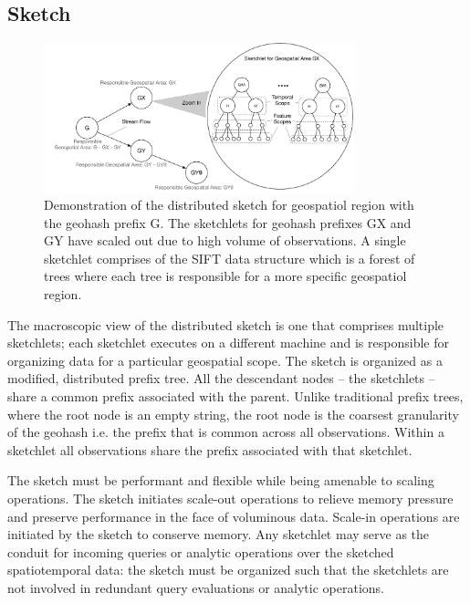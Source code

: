 \subsection{Sketch}
\begin{figure}
    \centerline{\includegraphics[width=0.8\textwidth]{figures/dist-sketch.pdf}}
    \caption{Demonstration of the distributed sketch for geospatiol region with the geohash prefix G. The sketchlets for geohash prefixes GX and GY have scaled out due to high volume of observations. A single sketchlet comprises of the SIFT data structure which is a forest of trees where each tree is responsible for a more specific geospatiol region.}
    \label{fig:dist-sketch}
\end{figure}

The macroscopic view of the distributed sketch is one that comprises multiple sketchlets; each sketchlet executes on a different machine and is responsible for organizing data for a particular geospatial scope. The sketch is organized as a modified, distributed prefix tree. All the descendant nodes – the sketchlets – share a common prefix associated with the parent. Unlike traditional prefix trees, where the root node is an empty string, the root node is the coarsest granularity of the geohash i.e. the prefix that is common across all observations. Within a sketchlet all observations share the prefix associated with that sketchlet.

The sketch must be performant and flexible while being amenable to scaling operations. The sketch initiates scale-out operations to relieve memory pressure and preserve performance in the face of voluminous data. Scale-in operations are initiated by the sketch to conserve memory. Any sketchlet may serve as the conduit for incoming queries or analytic operations over the sketched spatiotemporal data: the sketch must be organized such that the sketchlets are not involved in redundant query evaluations or analytic operations. 

